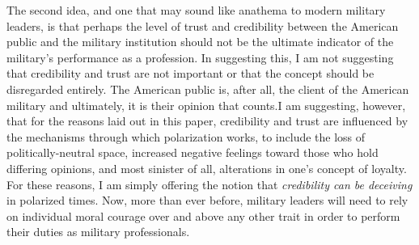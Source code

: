 \documentclass[12pt,]{article}
\begin{document}
The second idea, and one that may sound like anathema to modern military leaders, is that perhaps the level of trust and credibility between the American public and the military institution should not be the ultimate indicator of the military's performance as a profession. In suggesting this, I am not suggesting that credibility and trust are not important or that the concept should be disregarded entirely. The American public is, after all, the client of the American military and ultimately, it is their opinion that counts.I am suggesting, however, that for the reasons laid out in this paper, credibility and trust are influenced by the mechanisms through which polarization works, to include the loss of politically-neutral space, increased negative feelings toward those who hold differing opinions, and most sinister of all, alterations in one's concept of loyalty. For these reasons, I am simply offering the notion that \emph{credibility can be deceiving} in polarized times. Now, more than ever before, military leaders will need to rely on individual moral courage over and above any other trait in order to perform their duties as military professionals.\\
\singlespace
\pagebreak

\printbibliography
\end{document}
